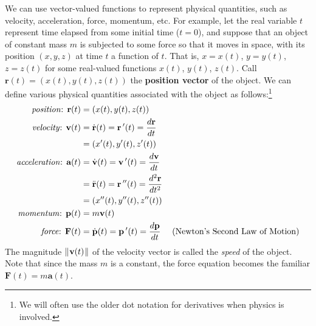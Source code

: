 We can use vector-valued functions to represent physical quantities, such as velocity, acceleration, force, momentum,
etc. For example, let the real variable $t$ represent time elapsed from some initial time ($t = 0$), and suppose
that an object of constant mass $m$ is subjected to some force so that it moves in space, with its position $(x,y,z)$ at
time $t$ a function of $t$. That is, $x = x(t)$, $y = y(t)$, $z = z(t)$ for some real-valued functions $x(t)$, $y(t)$,
$z(t)$. Call $\textbf{r}(t) = (x(t),y(t),z(t))$ the \textbf{position vector} of the object. We
can define various physical quantities associated with the object as follows:\footnote{We will often use the
older dot notation for derivatives when physics is involved.}
\begin{align*}
 \text{\emph{position}: } \textbf{r}(t) &= (x(t),y(t),z(t))\\
 \text{\emph{velocity}: } \textbf{v}(t) &= \dot{\textbf{r}}(t) = \textbf{r}\,'(t) = \dfrac{d \textbf{r}}{dt}\\
 &= (x'(t),y'(t),z'(t))\\
 \text{\emph{acceleration}: } \textbf{a}(t) &= \dot{\textbf{v}}(t) = \textbf{v}\,'(t) = \dfrac{d \textbf{v}}{dt}\\
 &= \ddot{\textbf{r}}(t) = \textbf{r}\,''(t) = \dfrac{d^2 \textbf{r}}{dt^2}\\
 &= (x''(t),y''(t),z''(t))\\
 \text{\emph{momentum}: } \textbf{p}(t) &= m \textbf{v}(t)\\
 \text{\emph{force}: } \textbf{F}(t) &= \dot{\textbf{p}}(t) = \textbf{p}\,'(t) = \dfrac{d \textbf{p}}{dt}
 \text{~~~~(Newton's Second Law of Motion)}
\end{align*}
The magnitude $\lVert\mspace{1mu}\textbf{v}(t)\mspace{1mu}\rVert$ of the velocity vector is called the \emph{speed} of the object.
Note that since the mass $m$ is a constant, the force equation becomes the familiar
$\textbf{F}(t) = m \textbf{a}(t)$.


